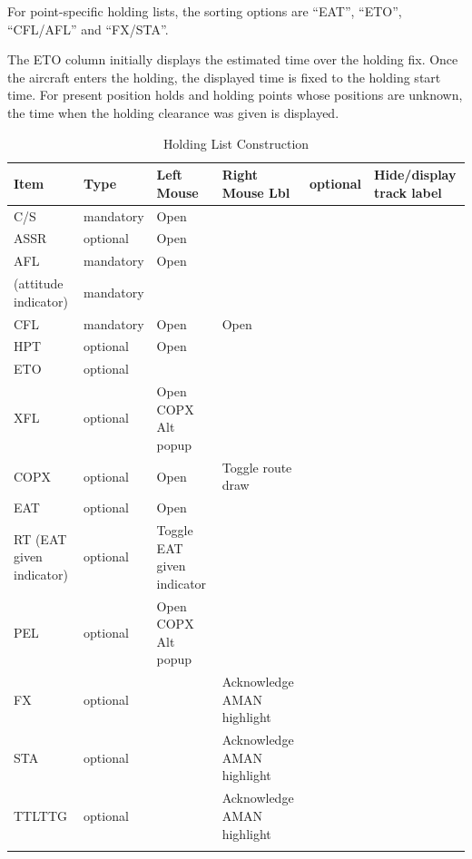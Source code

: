 \documentclass[a4paper,oneside,11pt]{memoir}
\begin{document}
For point-specific holding lists, the sorting options are “EAT”, “ETO”, “CFL/AFL” and “FX/STA”.

\bigskip

The ETO column initially displays the estimated time over the holding fix. Once the aircraft enters the holding, the displayed time is fixed to the holding start time. For present position holds and holding points whose positions are unknown, the time when the holding clearance was given is displayed.

\begin{longtable}{|p{}|p{}|p{}|p{}|} \hline
  \textbf{Item}             & \textbf{Type} & \textbf{Left Mouse}   & \textbf{Right Mouse} \endhead \hline
    Lbl                     & optional  & Hide/display track label  &                             \\ \hline
    C/S                     & mandatory & Open      &                             \\ \hline
    ASSR                    & optional  & Open    &                             \\ \hline
    AFL                     & mandatory & Open     &                             \\ \hline
    (attitude indicator)    & mandatory &                           &                             \\ \hline
    CFL                     & mandatory & Open     & Open        \\ \hline
    HPT                     & optional  & Open      &                             \\ \hline
    ETO                     & optional  &                           &                             \\ \hline
    XFL                     & optional  & Open COPX Alt popup       &                             \\ \hline
    COPX                    & optional  & Open     & Toggle route draw           \\ \hline
    EAT                     & optional  & Open      &                             \\ \hline
    RT (EAT given indicator)& optional  & Toggle EAT given indicator&                             \\ \hline
    PEL                     & optional  & Open COPX Alt popup       &                             \\ \hline
    FX                      & optional  &                           & Acknowledge AMAN highlight  \\ \hline
    STA                     & optional  &                           & Acknowledge AMAN highlight  \\ \hline
    TTLTTG                  & optional  &                           & Acknowledge AMAN highlight  \\ \hline
    \caption{Holding List Construction}
  \end{longtable}
\end{document}
